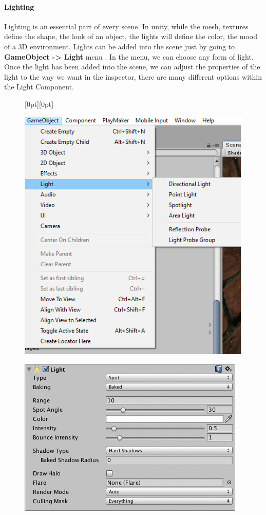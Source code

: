 \documentclass[a4paper, 13pt]{extarticle}
\begin{document}
{\paragraph{Lighting}
Lighting is an essential part of every scene. In unity, while the mesh, textures define the shape, the look of an object, the lights will define the color, the mood of a 3D environment. Lights can be added into the scene just by going to {\bfseries GameObject -> Light} menu . In the menu, we can choose any form of light. Once the light has been added into the scene, we can adjust the properties of the light to the way we want in the inspector, there are many different options within the Light Component. 
\newpage
\begin{figure}[h]
	\centering
	\raisebox{-25mm}[0pt][0pt]{
		\begin{minipage}{.4\textwidth}
			\centering
			\includegraphics[width=0.8\linewidth]{intructions/choose_light.png}
			\centering
			\label{fig:test26}
		\end{minipage}
		\begin{minipage}{.45\textwidth}
			\centering
			\includegraphics[width=1.2\linewidth]{intructions/light_properties.png}

\end{minipage}}
\end{figure}}
\end{document}
